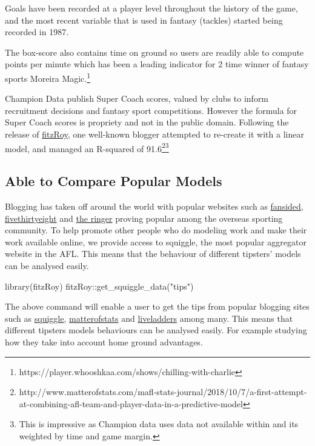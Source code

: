 Goals have been recorded at a player level throughout the history of the game, and the most recent variable that is used in fantasy (tackles) started being recorded in 1987.

The box-score also contains time on ground so users are readily able to compute points per minute which has been a leading indicator for 2 time winner of fantasy sports  Moreira Magic.\footnote{https://player.whooshkaa.com/shows/chilling-with-charlie}

Champion Data publish Super Coach scores, valued by clubs to inform recruitment decisions and fantasy sport competitions. However the formula for Super Coach scores is propriety and not in the public domain. Following the release of \href{https://github.com/jimmyday12/fitzRoy}{fitzRoy}, one well-known blogger attempted to re-create it with a linear model, and managed an R-squared of 91.6\footnote{http://www.matterofstats.com/mafl-stats-journal/2018/10/7/a-first-attempt-at-combining-afl-team-and-player-data-in-a-predictive-model}\footnote{This is impressive as Champion data uses data not available within  and its weighted by time and game margin.}


\subsection{Able to Compare Popular Models}

Blogging has taken off around the world with popular websites such as \href{https://fansided.com}{fansided}, \href{http://fivethirtyeight.com}{fivethirtyeight} and \href{https://www.theringer.com}{the ringer} proving popular among the overseas sporting community.
To help promote other people who do modeling work and make their work available online, we provide access to squiggle, the most popular aggregator website in the AFL. This means that the behaviour of different tipsters' models can be analysed easily.

\begin{example}

library(fitzRoy)
fitzRoy::get_squiggle_data("tips")
\end{example}

The above command will enable a user to get the tips from popular blogging sites such as \href{https://squiggle.com.au}{squiggle}, \href{http://www.matterofstats.com}{matterofstats} and \href{https://www.liveladders.com/AFL/}{liveladders} among many. This means that different tipsters models behaviours can be analysed easily. For example studying how they take into account home ground advantages.


